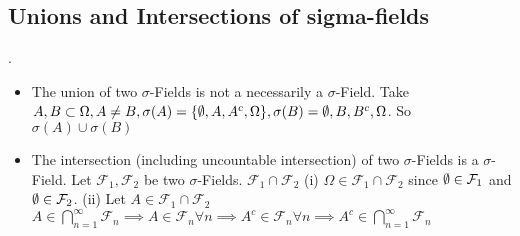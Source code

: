 \documentclass[class=article, crop=false]{standalone}
\begin{document}
\subsection{Unions and Intersections of sigma-fields}.
\begin{itemize}
	\item The union of two $\sigma$-Fields is not a necessarily a $\sigma$-Field. Take $A,B \subset \Omega, A \neq B, \sigma(A)=\{\emptyset,A,A^{c},\Omega\}, \sigma(B)={\emptyset,B,B^{c},\Omega}$. So 
			$\sigma(A) \cup \sigma(B)$ 
		\item The intersection (including uncountable intersection) of two $\sigma$-Fields is a $\sigma$-Field. Let $\mathcal{F}_1,\mathcal{F}_2$ be two $\sigma$-Fields. $\mathcal{F}_1 \cap \mathcal{F}_2$ 
			(i) $\Omega \in \mathcal{F}_1 \cap \mathcal{F}_2$ since $\emptyset \in \mathcal{F}_1$ and $\emptyset \in  \mathcal{F}_2$.
			(ii) Let $A \in \mathcal{F}_1 \cap \mathcal{F}_2$ 
			$A \in \bigcap_{n= 1}^{ \infty} \mathcal{F}_n \implies A \in \mathcal{F}_n \forall n \implies A^{c} \in \mathcal{F}_n \forall n \implies A^{c} \in \bigcap_{n= 1}^{ \infty} \mathcal{F}_n $
\end{itemize}
\end{document}
